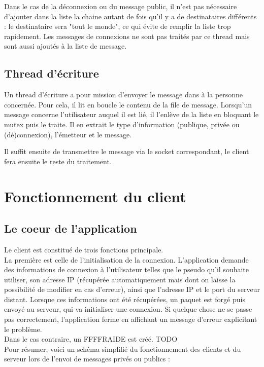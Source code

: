 			Dans le cas de la déconnexion ou du message public, il n'est pas nécessaire d'ajouter dans la liste la chaine autant de fois qu'il y a de destinataires différents : le destinataire sera "tout le monde", ce qui évite de remplir la liste trop rapidement. Les messages de connexions ne sont pas traités par ce thread mais sont aussi ajoutés à la liste de message.
			
		\subsection{Thread d'écriture}
			Un thread d'écriture a pour mission d'envoyer le message dans à la personne concernée. Pour cela, il lit en boucle le contenu de la file de message. Lorsqu'un message concerne l'utilisateur auquel il est lié, il l'enlève de la liste en bloquant le mutex puis le traite. Il en extrait le type d'information (publique, privée ou (dé)connexion), l'émetteur et le message.
			
			Il suffit ensuite de transmettre le message via le socket correspondant, le client fera ensuite le reste du traitement.
			
	
	\section{Fonctionnement du client}
		\subsection{Le coeur de l'application}
			Le client est constitué de trois fonctions principale.\\
			
			La première est celle de l'initialisation de la connexion. L'application demande des informations de connexion à l'utilisateur telles que le pseudo qu'il souhaite utiliser, son adresse IP (récupérée automatiquement mais dont on laisse la possibilité de modifier en cas d'erreur), ainsi que l'adresse IP et le port du serveur distant. Lorsque ces informations ont été récupérées, un paquet est forgé puis envoyé au serveur, qui va initialiser une connexion. Si quelque chose ne se passe pas correctement, l'application ferme en affichant un message d'erreur explicitant le problème.\\
			
			Dans le cas contraire, un FFFFRAIDE est créé. {\Huge TODO}\\
	
			\newpage
			Pour résumer, voici un schéma simplifié du fonctionnement des clients et du serveur lors de l'envoi de messages privés ou publics :
		
